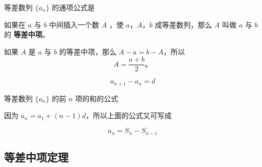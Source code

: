\documentclass[10pt,cn]{elegantbook}
\begin{document}
	等差数列 $\{a_n\}$ 的通项公式是
	\begin{center}
	\end{center}
	
	如果在 $a$ 与 $b$ 中间插入一个数 $A$ ，使 $a$，$A$，$b$ 成等差数列，那么 $A$ 叫做 $a$ 与 $b$ 的 \textbf{等差中项}。
	
	如果 $A$ 是 $a$ 与 $b$ 的等差中项，那么 $A - a = b - A$，所以
	$$ A = \dfrac{a + b}{2} \text{。}$$
	
	\[a_{n+1}-a_{n}=d\]
	
	等差数列 $\{a_n\}$ 的前 $n$ 项的和的公式
	\begin{center}
	\end{center}
	
	因为 $a_n = a_1 + (n - 1) d$，所以上面的公式又可写成
	\begin{center}
	\end{center}
	
		\begin{center}
	\end{center}
	
$$a_{n}=S_{n}-S_{n-1}$$

	\subsection{等差中项定理}
	
\end{document}
